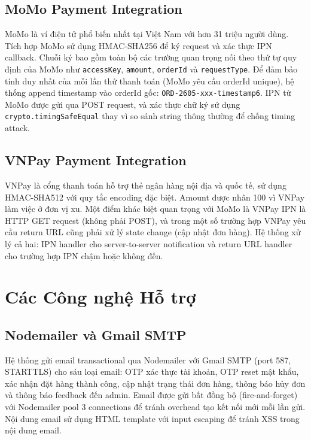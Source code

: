 \subsection{MoMo Payment Integration}

MoMo là ví điện tử phổ biến nhất tại Việt Nam với hơn 31 triệu người dùng. Tích hợp MoMo sử dụng HMAC-SHA256 để ký request và xác thực IPN callback. Chuỗi ký bao gồm toàn bộ các trường quan trọng nối theo thứ tự quy định của MoMo như \texttt{accessKey}, \texttt{amount}, \texttt{orderId} và \texttt{requestType}. Để đảm bảo tính duy nhất của mỗi lần thử thanh toán (MoMo yêu cầu orderId unique), hệ thống append timestamp vào orderId gốc: \texttt{ORD-2605-xxx-{timestamp6}}. IPN từ MoMo được gửi qua POST request, và xác thực chữ ký sử dụng \texttt{crypto.timingSafeEqual} thay vì so sánh string thông thường để chống timing attack.

\subsection{VNPay Payment Integration}

VNPay là cổng thanh toán hỗ trợ thẻ ngân hàng nội địa và quốc tế, sử dụng HMAC-SHA512 với quy tắc encoding đặc biệt. Amount được nhân 100 vì VNPay làm việc ở đơn vị xu. Một điểm khác biệt quan trọng với MoMo là VNPay IPN là HTTP GET request (không phải POST), và trong một số trường hợp VNPay yêu cầu return URL cũng phải xử lý state change (cập nhật đơn hàng). Hệ thống xử lý cả hai: IPN handler cho server-to-server notification và return URL handler cho trường hợp IPN chậm hoặc không đến.

\section{Các Công nghệ Hỗ trợ}

\subsection{Nodemailer và Gmail SMTP}

Hệ thống gửi email transactional qua Nodemailer với Gmail SMTP (port 587, STARTTLS) cho sáu loại email: OTP xác thực tài khoản, OTP reset mật khẩu, xác nhận đặt hàng thành công, cập nhật trạng thái đơn hàng, thông báo hủy đơn và thông báo feedback đến admin. Email được gửi bất đồng bộ (fire-and-forget) với Nodemailer pool 3 connections để tránh overhead tạo kết nối mới mỗi lần gửi. Nội dung email sử dụng HTML template với input escaping để tránh XSS trong nội dung email.

